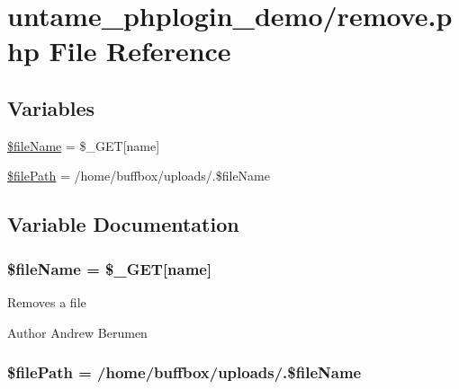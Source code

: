 \hypertarget{remove_8php}{}\section{untame\+\_\+phplogin\+\_\+demo/remove.php File Reference}
\label{remove_8php}
\subsection*{Variables}
\begin{DoxyCompactItemize}
\item 
\hyperlink{remove_8php_a68fbc5a9273a24181c50a057d11603fa}{\$file\+Name} = \$\+\_\+\+G\+E\+T\mbox{[}\textquotesingle{}name\textquotesingle{}\mbox{]}
\item 
\hyperlink{remove_8php_aaf525367b205eb15e464b979a035e4c6}{\$file\+Path} = \textquotesingle{}/home/buffbox/uploads/\textquotesingle{}.\$file\+Name
\end{DoxyCompactItemize}


\subsection{Variable Documentation}
\hypertarget{remove_8php_a68fbc5a9273a24181c50a057d11603fa}{}
\subsubsection[{\$file\+Name}]{\setlength{\rightskip}{0pt plus 5cm}\$file\+Name = \$\+\_\+\+G\+E\+T\mbox{[}\textquotesingle{}name\textquotesingle{}\mbox{]}}\label{remove_8php_a68fbc5a9273a24181c50a057d11603fa}
Removes a file \begin{DoxyAuthor}{Author}
Andrew Berumen 
\end{DoxyAuthor}
\hypertarget{remove_8php_aaf525367b205eb15e464b979a035e4c6}{}
\subsubsection[{\$file\+Path}]{\setlength{\rightskip}{0pt plus 5cm}\$file\+Path = \textquotesingle{}/home/buffbox/uploads/\textquotesingle{}.\$file\+Name}\label{remove_8php_aaf525367b205eb15e464b979a035e4c6}
